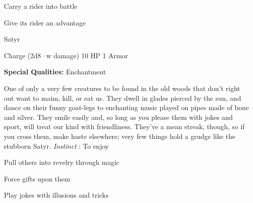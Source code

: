 \item Carry a rider into battle

 
\item Give its rider an advantage


\stopitemize
 
\startMonsterName
Satyr	 
\stopMonsterName
 

Charge (2d8·w damage)	10 HP	1 Armor

 


 
\startMonsterQualities
{\bf Special Qualities:}  Enchantment
\stopMonsterQualities
 
\startMonsterDescription
One of only a very few creatures to be found in the old woods that don’t right out want to maim, kill, or eat us. They dwell in glades pierced by the sun, and dance on their funny goat-legs to enchanting music played on pipes made of bone and silver. They smile easily and, so long as you please them with jokes and sport, will treat our kind with friendliness. They’ve a mean streak, though, so if you cross them, make haste elsewhere; very few things hold a grudge like the stubborn Satyr. {\em Instinct} : To enjoy
\stopMonsterDescription
 
\startitemize[1,packed]

\item Pull others into revelry through magic

 
\item Force gifts upon them

 
\item Play jokes with illusions and tricks


\stopitemize
 






